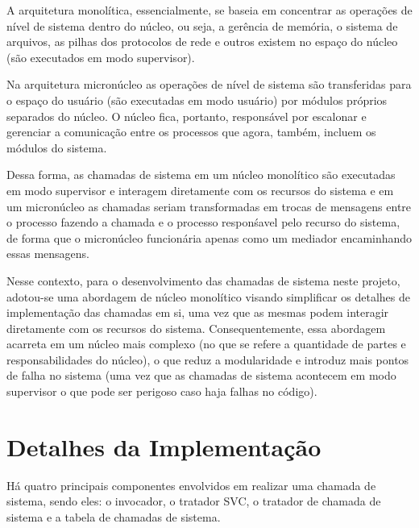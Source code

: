 A arquitetura monolítica, essencialmente, se baseia em concentrar as operações de nível de sistema dentro do núcleo, ou seja, a gerência de memória, o sistema de arquivos, as pilhas dos protocolos de rede e outros existem no espaço do núcleo (são executados em modo supervisor). 

Na arquitetura micronúcleo as operações de nível de sistema são transferidas para o espaço do usuário (são executadas em modo usuário) por módulos próprios separados do núcleo. O núcleo fica, portanto, responsável por escalonar e gerenciar a comunicação entre os processos que agora, também, incluem os módulos do sistema.

Dessa forma, as chamadas de sistema em um núcleo monolítico são executadas em modo supervisor e interagem diretamente com os recursos do sistema e em um micronúcleo as chamadas seriam transformadas em trocas de mensagens entre o processo fazendo a chamada e o processo responśavel pelo recurso do sistema, de forma que o micronúcleo funcionária apenas como um mediador encaminhando essas mensagens.

Nesse contexto, para o desenvolvimento das chamadas de sistema neste projeto, adotou-se uma abordagem de núcleo monolítico visando simplificar os detalhes de implementação das chamadas em si, uma vez que as mesmas podem interagir diretamente com os recursos do sistema. Consequentemente, essa abordagem acarreta em um núcleo mais complexo (no que se refere a quantidade de partes e responsabilidades do núcleo), o que reduz a modularidade e introduz mais pontos de falha no sistema (uma vez que as chamadas de sistema acontecem em modo supervisor o que pode ser perigoso caso haja falhas no código).
\section{Detalhes da Implementação}
%
%
Há quatro principais componentes envolvidos em realizar uma chamada de sistema, sendo eles: o invocador, o tratador SVC, o tratador de chamada de sistema e a tabela de chamadas de sistema.


